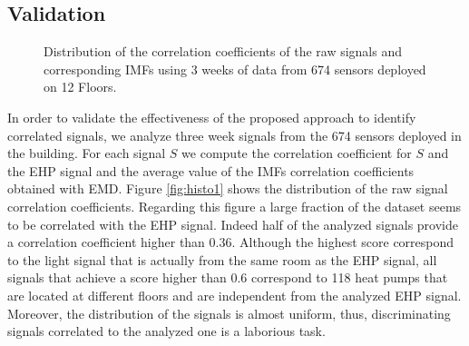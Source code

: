 \subsection{Validation}
\begin{figure}
\centering
 \caption{Distribution of the correlation coefficients of the raw signals and corresponding IMFs using 3 weeks of data from 674 sensors deployed on 12 Floors.}
\label{fig:histo}
\end{figure}

In order to validate the effectiveness of the proposed approach to identify correlated signals, we analyze three week signals from the 674 sensors deployed in the building.
For each signal $S$ we compute the correlation coefficient for $S$ and the EHP signal and the average value of the IMFs correlation coefficients obtained with EMD.
Figure \ref{fig:histo1} shows the distribution of the raw signal correlation coefficients.
Regarding this figure a large fraction of the dataset seems to be correlated with the EHP signal.
Indeed half of the analyzed signals provide a correlation coefficient higher than $0.36$.
Although the highest score correspond to the light signal that is actually from the same room as the EHP signal, all signals that achieve a score higher than $0.6$  correspond to 118 heat pumps that are located at different floors and are independent from the analyzed EHP signal.
Moreover, the distribution of the signals is almost uniform, thus, discriminating signals correlated to the analyzed one is a laborious task.

